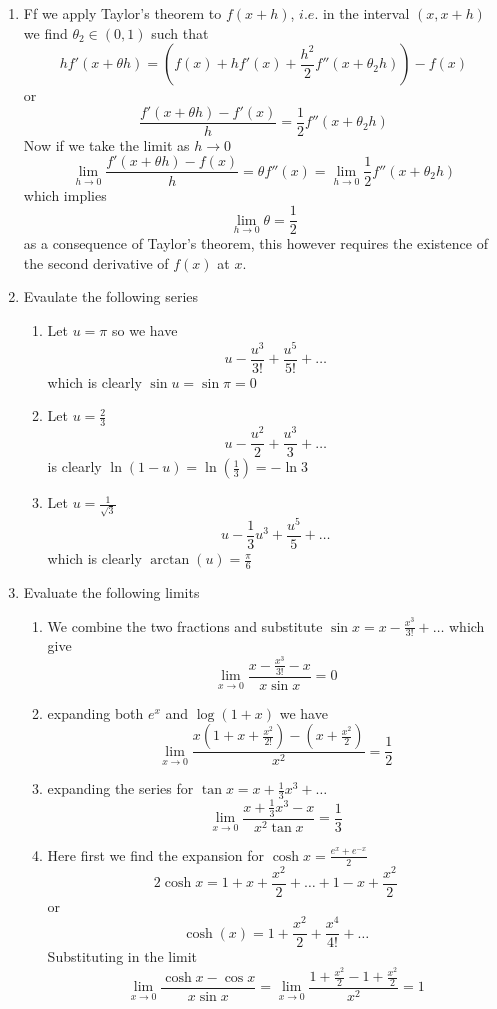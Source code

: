\documentclass[12pt]{article}
\begin{document}
\begin{enumerate}
	\item
		Ff we apply Taylor's theorem to $f(x +h)$, $i$.$e$. in the interval $(x,x+h)$ we find $\theta_{2} \in (0,1)$ such that
		$$
		hf'(x + \theta h) = \left( f(x) + hf'(x) + \frac{h^{2}}{2}f''(x + \theta_{2}h) \right)-f(x)
		$$
		or
		$$
		\frac{f'(x + \theta h)-f'(x)}{h} =\frac{1}{2}f''(x +\theta_{2}h)
		$$
		Now if we take the limit as $h \to 0$
		$$
		\lim_{ h \to 0 } \frac{f'(x + \theta h)-f(x)}{h} = \theta f''(x) = \lim_{  h \to 0 } \frac{1}{2}f''(x + \theta_{2}h)
		$$
		which implies
		$$
		\lim_{ h \to 0 } \theta = \frac{1}{2}
		$$
		as a consequence of Taylor's theorem, this however requires the existence of the second derivative of $f(x)$ at $x$.
	\item Evaulate the following series
		\begin{enumerate}
			\item
				Let $u = \pi$ so we have
				$$
				u -\frac{u^{3}}{3!} + \frac{u^{5}}{5!} + \dots
				$$
				which is clearly $\sin u = \sin \pi = 0$

			\item
				Let $u = \frac{2}{3}$
				$$
				u - \frac{u^{2}}{2} + \frac{u^{3}}{3} + \dots
				$$
				is clearly $\ln(1-u) = \ln\left( \frac{1}{3} \right) = -\ln 3$

			\item
				Let $u=\frac{1}{\sqrt{ 3 }}$
				$$
				u -\frac{1}{3}u^{3} + \frac{u^{5}}{5} + \dots
				$$
				which is clearly $\arctan(u) = \frac{\pi}{6}$
		\end{enumerate}
	\item Evaluate the following limits
		\begin{enumerate}
			\item
				We combine the two fractions and substitute $\sin x = x -\frac{x^{3}}{3!} + \dots$ which give
				$$
				\lim_{ x \to 0 } \frac{x-\frac{x^{3}}{3!} -x}{x \sin x} = 0
				$$
			\item
				expanding both $e^{ x }$ and $\log(1+x)$ we have
				$$
				\lim_{ x \to 0 } \frac{x\left( 1 + x + \frac{x^{2}}{2!} \right)-\left( x+\frac{x^{2}}{2} \right)}{x^{2}} = \frac{1}{2}
				$$
			\item
				expanding the series for $\tan x = x + \frac{1}{3 }x^{3} + \dots$ 
				$$
				\lim_{ x \to 0 } \frac{x + \frac{1}{3}x^{3}-x}{x^{2}\tan x} = \frac{1}{3}
				$$
			\item
				Here first we find the expansion for $\cosh x = \frac{e^{ x } + e^{ -x }}{2}$
				$$
				2\cosh x = 1 + x + \frac{x^{2}}{2} + \dots + 1-x + \frac{x^{2}}{2}
				$$
				or
				$$
				\cosh(x) = 1 + \frac{x^{2}}{2} + \frac{x^{4}}{4!} + \dots
				$$
				Substituting in the limit
				$$
				\lim_{  x \to 0 } \frac{\cosh x - \cos x}{x\sin x} = \lim_{ x \to 0 } \frac{1+\frac{x^{2}}{2} -1 + \frac{x^{2}}{2}}{x^{2}} = 1
				$$
		\end{enumerate}


\end{enumerate}
\end{document}
